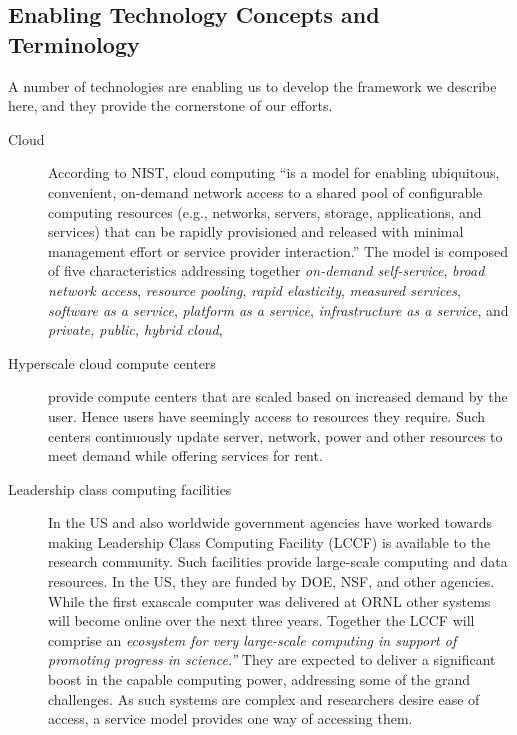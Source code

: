 

\subsection{Enabling Technology Concepts and Terminology}

A number of technologies are enabling us to develop the framework we
describe here, and they provide the cornerstone of our efforts.

\begin{description}

\item[Cloud]
     According to NIST, cloud computing ``is a model for enabling
     ubiquitous, convenient, on-demand network access to a shared pool
     of configurable computing resources (e.g., networks, servers,
     storage, applications, and services) that can be rapidly
     provisioned and released with minimal management effort or
     service provider interaction.'' The model is composed of five
     characteristics addressing together {\em on-demand self-service},
     {\em broad network access}, {\em resource pooling}, {\em rapid
     elasticity}, {\em measured services}, {\em software as a
     service}, {\em platform as a service}, {\em infrastructure as a
     service}, and {\em private, public, hybrid cloud},

\item[Hyperscale cloud compute centers]
     provide compute centers that are scaled based on increased demand
     by the user. Hence users have seemingly access to resources they
     require. Such centers continuously update server, network, power
     and other resources to meet demand while offering services for
     rent.

\item[Leadership class computing facilities] 
     In the US and also worldwide \cite{www-top500} government
     agencies have worked towards making Leadership Class Computing
     Facility (LCCF) is available to the research community. Such
     facilities provide large-scale computing and data resources. In
     the US, they are funded by DOE, NSF, and other
     agencies. While the first exascale computer was delivered at
     ORNL \cite{www-top500} other systems will become online over the
     next three years. Together the LCCF will comprise an {\em ecosystem
     for very large-scale computing in support of promoting progress
     in science.''} They are expected to deliver a significant boost
     in the capable computing power, addressing some of the grand
     challenges. As such systems are complex and researchers desire
     ease of access, a service model provides one way of accessing
     them.


\end{description}
